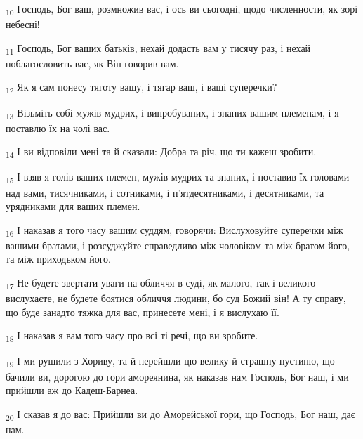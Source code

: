 \begin{tcolorbox}
\textsubscript{10} Господь, Бог ваш, розмножив вас, і ось ви сьогодні, щодо численности, як зорі небесні!
\end{tcolorbox}
\begin{tcolorbox}
\textsubscript{11} Господь, Бог ваших батьків, нехай додасть вам у тисячу раз, і нехай поблагословить вас, як Він говорив вам.
\end{tcolorbox}
\begin{tcolorbox}
\textsubscript{12} Як я сам понесу тяготу вашу, і тягар ваш, і ваші суперечки?
\end{tcolorbox}
\begin{tcolorbox}
\textsubscript{13} Візьміть собі мужів мудрих, і випробуваних, і знаних вашим племенам, і я поставлю їх на чолі вас.
\end{tcolorbox}
\begin{tcolorbox}
\textsubscript{14} І ви відповіли мені та й сказали: Добра та річ, що ти кажеш зробити.
\end{tcolorbox}
\begin{tcolorbox}
\textsubscript{15} І взяв я голів ваших племен, мужів мудрих та знаних, і поставив їх головами над вами, тисячниками, і сотниками, і п'ятдесятниками, і десятниками, та урядниками для ваших племен.
\end{tcolorbox}
\begin{tcolorbox}
\textsubscript{16} І наказав я того часу вашим суддям, говорячи: Вислуховуйте суперечки між вашими братами, і розсуджуйте справедливо між чоловіком та між братом його, та між приходьком його.
\end{tcolorbox}
\begin{tcolorbox}
\textsubscript{17} Не будете звертати уваги на обличчя в суді, як малого, так і великого вислухаєте, не будете боятися обличчя людини, бо суд Божий він! А ту справу, що буде занадто тяжка для вас, принесете мені, і я вислухаю її.
\end{tcolorbox}
\begin{tcolorbox}
\textsubscript{18} І наказав я вам того часу про всі ті речі, що ви зробите.
\end{tcolorbox}
\begin{tcolorbox}
\textsubscript{19} І ми рушили з Хориву, та й перейшли цю велику й страшну пустиню, що бачили ви, дорогою до гори амореянина, як наказав нам Господь, Бог наш, і ми прийшли аж до Кадеш-Барнеа.
\end{tcolorbox}
\begin{tcolorbox}
\textsubscript{20} І сказав я до вас: Прийшли ви до Аморейської гори, що Господь, Бог наш, дає нам.
\end{tcolorbox}
